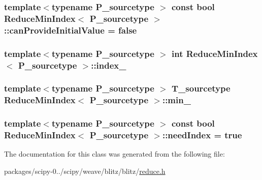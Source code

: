 \subsubsection[{can\+Provide\+Initial\+Value}]{\setlength{\rightskip}{0pt plus 5cm}template$<$typename P\+\_\+sourcetype $>$ const {\bf bool} {\bf Reduce\+Min\+Index}$<$ P\+\_\+sourcetype $>$\+::can\+Provide\+Initial\+Value = {\bf false}\hspace{0.3cm}{\ttfamily [static]}}\label{classReduceMinIndex_a2ae32e9434b2b1bbc5b8720ca94b54eb}
\hypertarget{classReduceMinIndex_a8ab15dcf04d12322bb9486c236c1bb42}{}
\subsubsection[{index\+\_\+}]{\setlength{\rightskip}{0pt plus 5cm}template$<$typename P\+\_\+sourcetype $>$ int {\bf Reduce\+Min\+Index}$<$ P\+\_\+sourcetype $>$\+::index\+\_\+\hspace{0.3cm}{\ttfamily [protected]}}\label{classReduceMinIndex_a8ab15dcf04d12322bb9486c236c1bb42}
\hypertarget{classReduceMinIndex_af88672c6246ca52ebcbc09963cdda02c}{}
\subsubsection[{min\+\_\+}]{\setlength{\rightskip}{0pt plus 5cm}template$<$typename P\+\_\+sourcetype $>$ {\bf T\+\_\+sourcetype} {\bf Reduce\+Min\+Index}$<$ P\+\_\+sourcetype $>$\+::min\+\_\+\hspace{0.3cm}{\ttfamily [protected]}}\label{classReduceMinIndex_af88672c6246ca52ebcbc09963cdda02c}
\hypertarget{classReduceMinIndex_add70aed71f94752c8ab7295a89550c4e}{}
\subsubsection[{need\+Index}]{\setlength{\rightskip}{0pt plus 5cm}template$<$typename P\+\_\+sourcetype $>$ const {\bf bool} {\bf Reduce\+Min\+Index}$<$ P\+\_\+sourcetype $>$\+::need\+Index = {\bf true}\hspace{0.3cm}{\ttfamily [static]}}\label{classReduceMinIndex_add70aed71f94752c8ab7295a89550c4e}


The documentation for this class was generated from the following file\+:\begin{DoxyCompactItemize}
\item 
packages/scipy-\/0../scipy/weave/blitz/blitz/\hyperlink{reduce_8h}{reduce.\+h}\end{DoxyCompactItemize}
